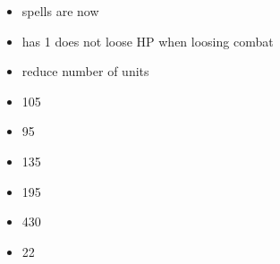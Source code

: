 

\subtitle{2023 \betaname{} 2}
\begin{itemize}
\item \altbattle{} \holyrelic{} spells are now  \aura
\item \stank{} has \DefensiveSkillInitials{} 1 \wordand{} does not loose HP when loosing combat
\item \knightlyorders{} reduce number of \eleccav{} units
\item \inquisitor{} \basecost{} 105 
\item \inquisitor{} \horse{} \wordand{} \lighttroops{} 95 
\item \statemilitiaSINGULAR{} \basecost{} 135 
\item \flagellants{} \basecost{} 195 
\item \stank{} \basecost{} 430 
\item \reiters{} \extramodel{} 22 
\end{itemize}
